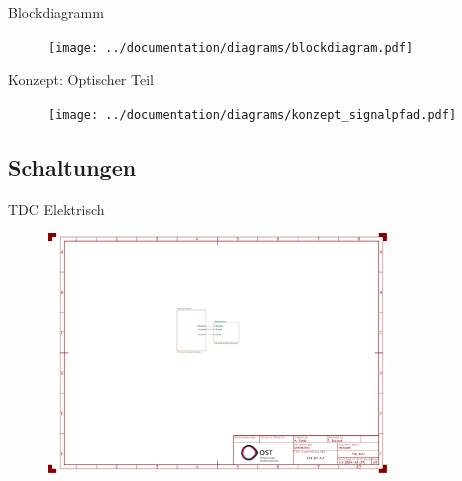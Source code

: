 \begin{frame}{Blockdiagramm}
    \begin{figure}
        \texttt{[image: ../documentation/diagrams/blockdiagram.pdf]}
    \end{figure}

\end{frame}

\begin{frame}{Konzept: Optischer Teil}
    \begin{figure}
        \texttt{[image: ../documentation/diagrams/konzept\_signalpfad.pdf]}
    \end{figure}

    \iconoptical
\end{frame}

\subsection{Schaltungen}

\begin{frame}{TDC Elektrisch}
    \begin{figure}
        \includegraphics[page=2, trim=80 330 750 310, clip, width=0.8\textwidth]{../documentation/attachments/schematic.pdf}
    \end{figure}

    \iconelectrical
\end{frame}

